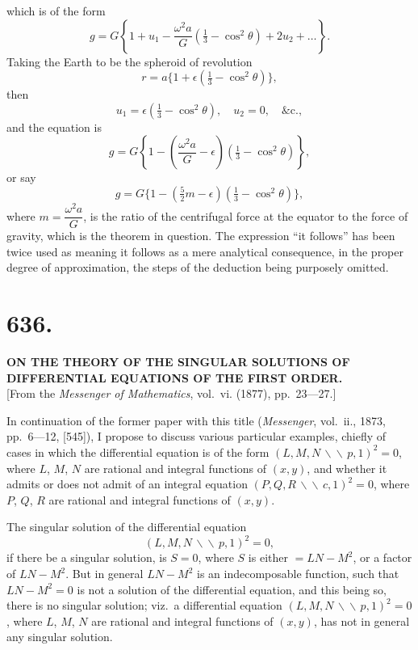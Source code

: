 \documentclass[12pt,a4paper]{article}
\begin{document}
\noindent which is of the form
\[
g = G\left\{1 + u_1 - \frac{\omega^2 a}{G}(\tfrac{1}{3} - \cos^2\theta) + 2 u_2 + \ldots\right\}.
\]
Taking the Earth to be the spheroid of revolution
\[
r = a\{1 + \epsilon(\tfrac{1}{3} - \cos^2\theta)\},
\]
then
\[
u_1 = \epsilon(\tfrac{1}{3} - \cos^2\theta), \quad u_2 = 0, \quad \&\text{c.},
\]
and the equation is
\[
g = G\left\{1 - \left(\frac{\omega^2 a}{G} - \epsilon\right)(\tfrac{1}{3} - \cos^2\theta)\right\},
\]
or say
\[
g = G\{1 - (\tfrac{5}{2}m - \epsilon)(\tfrac{1}{3} - \cos^2\theta)\},
\]
where $m = \dfrac{\omega^2 a}{G}$, is the ratio of the centrifugal force at the equator to the force of gravity, which is the theorem in question. The expression ``it follows'' has been twice used as meaning it follows as a mere analytical consequence, in the proper degree of approximation, the steps of the deduction being purposely omitted.

\clearpage
\setcounter{page}{19}

\section*{636.}

\begin{center}
\textbf{ON THE THEORY OF THE SINGULAR SOLUTIONS OF DIFFERENTIAL EQUATIONS OF THE FIRST ORDER.}\\[1em]
[From the \textit{Messenger of Mathematics}, vol.~vi. (1877), pp.~23---27.]
\end{center}

In continuation of the former paper with this title (\textit{Messenger}, vol.~ii., 1873, pp.~6---12, [545]), I propose to discuss various particular examples, chiefly of cases in which the differential equation is of the form $(L, M, N\,\backslash\!\backslash\, p, 1)^2 = 0$, where $L$, $M$, $N$ are rational and integral functions of $(x, y)$, and whether it admits or does not admit of an integral equation $(P, Q, R\,\backslash\!\backslash\, c, 1)^2 = 0$, where $P$, $Q$, $R$ are rational and integral functions of $(x, y)$.

The singular solution of the differential equation
\[
(L, M, N\,\backslash\!\backslash\, p, 1)^2 = 0,
\]
if there be a singular solution, is $S = 0$, where $S$ is either $= L N - M^2$, or a factor of $L N - M^2$. But in general $L N - M^2$ is an indecomposable function, such that $L N - M^2 = 0$ is not a solution of the differential equation, and this being so, there is no singular solution; viz.\ a differential equation $(L, M, N\,\backslash\!\backslash\, p, 1)^2 = 0$, where $L$, $M$, $N$ are rational and integral functions of $(x, y)$, has not in general any singular solution.
\end{document}
